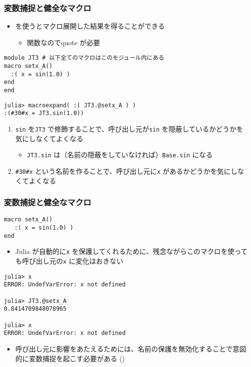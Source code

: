 \begin{frame}[containsverbatim]
  \frametitle{変数捕捉と健全なマクロ}
\begin{itemize}
  \item {} を使うとマクロ展開した結果を得ることができる
    \begin{itemize}
      \item 関数なのでquote が必要
    \end{itemize}
\end{itemize}
\begin{lstlisting}
module JT3 # 以下全てのマクロはこのモジュール内にある
macro setx_A()
  :( x = sin(1.0) )
end
end
\end{lstlisting}

\begin{lstlisting}
julia> macroexpand( :( JT3.@setx_A ) )
:(#30#x = JT3.sin(1.0))
\end{lstlisting}

\begin{enumerate}
  \item \verb|sin| を\verb|JT3| で修飾することで、呼び出し元が\verb|sin| を隠蔽しているかどうかを気にしなくてよくなる
    \begin{itemize}
      \item \verb|JT3.sin| は（名前の隠蔽をしていなければ）\verb|Base.sin| になる
    \end{itemize}
  \item \verb|#30#x| という名前を作ることで、呼び出し元に\verb|x| があるかどうかを気にしなくてよくなる
\end{enumerate}

\end{frame}

\begin{frame}[containsverbatim]
\frametitle{変数捕捉と健全なマクロ}
\begin{lstlisting}
macro setx_A()
   :( x = sin(1.0) )
end
\end{lstlisting}
\begin{itemize}
  \item Julia が自動的に\verb|x| を保護してくれるために、残念ながらこのマクロを使っても呼び出し元の\verb|x| に変化はおきない
\end{itemize}
\begin{lstlisting}
julia> x
ERROR: UndefVarError: x not defined

julia> JT3.@setx_A
0.8414709848078965

julia> x
ERROR: UndefVarError: x not defined
\end{lstlisting}
\begin{itemize}
  \item 呼び出し元に影響をあたえるためには、名前の保護を無効化することで意図的に変数捕捉を起こす必要がある ()
\end{itemize}
\end{frame}

